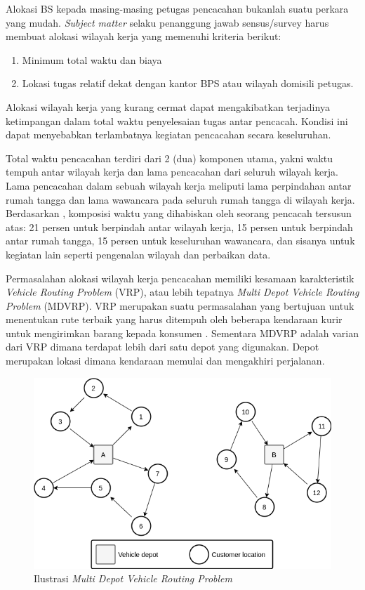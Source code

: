 Alokasi BS kepada masing-masing petugas pencacahan bukanlah suatu perkara yang mudah. \textit{Subject matter} selaku penanggung jawab sensus/survey harus membuat alokasi wilayah kerja yang memenuhi kriteria berikut: 
\begin{enumerate}
	\item Minimum total waktu dan biaya 
	\item Lokasi tugas relatif dekat dengan kantor BPS atau wilayah domisili petugas. 
\end{enumerate}
Alokasi wilayah kerja yang kurang cermat dapat mengakibatkan terjadinya ketimpangan dalam total waktu penyelesaian tugas antar pencacah. Kondisi ini dapat menyebabkan terlambatnya kegiatan pencacahan secara keseluruhan.


Total waktu pencacahan terdiri dari 2 (dua) komponen utama, yakni waktu tempuh antar wilayah kerja dan lama pencacahan dari seluruh wilayah kerja. Lama pencacahan dalam sebuah wilayah kerja meliputi lama perpindahan antar rumah tangga dan lama wawancara pada seluruh rumah tangga di wilayah kerja. Berdasarkan \citep{sudman_time_1965}, komposisi waktu yang dihabiskan oleh seorang pencacah tersusun atas: 21 persen untuk berpindah antar wilayah kerja, 15 persen untuk berpindah antar rumah tangga, 15 persen untuk keseluruhan wawancara, dan sisanya untuk kegiatan lain seperti pengenalan wilayah dan perbaikan data.


Permasalahan alokasi wilayah kerja pencacahan memiliki kesamaan karakteristik \textit{Vehicle Routing Problem} (VRP), atau lebih tepatnya \textit{Multi Depot Vehicle Routing Problem} (MDVRP). VRP merupakan suatu permasalahan yang bertujuan untuk menentukan rute terbaik yang harus ditempuh oleh beberapa kendaraan kurir untuk mengirimkan barang kepada konsumen \citep{dantzig_truck_1959}. Sementara MDVRP adalah varian dari VRP dimana terdapat lebih dari satu depot yang digunakan. Depot merupakan lokasi dimana kendaraan memulai dan mengakhiri perjalanan.


\begin{figure}[!]
    \centering
    \includegraphics[width=12cm]{Resources/Images/mdvrp-illustration}
    \caption{Ilustrasi \textit{Multi Depot Vehicle Routing Problem}}
    \label{fig:mtsp-ilustration}
\end{figure}


